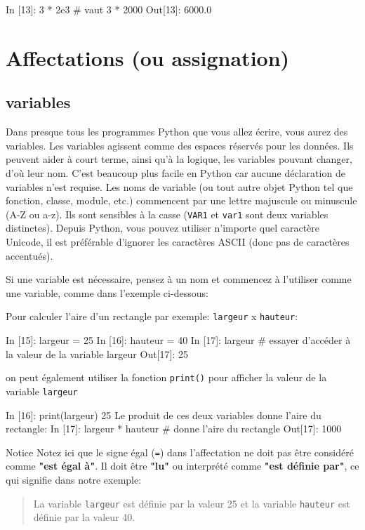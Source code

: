 \documentclass[%
oneside,                 %
final,                   %
10pt]{article}
\begin{document}
\bipy
In [13]: 3 * 2e3   # vaut 3 * 2000
Out[13]: 6000.0
\eipy
\section{Affectations (ou assignation)}

\subsection{variables}
Dans presque tous les programmes Python que vous allez écrire, vous aurez des variables. Les variables agissent comme des espaces réservés pour les données. Ils peuvent aider à court terme, ainsi qu’à la logique, les variables pouvant changer, d’où leur nom. C’est beaucoup plus facile en Python car aucune déclaration de variables n’est requise. Les noms de variable (ou tout autre objet Python tel que fonction, classe, module, etc.) commencent par une lettre majuscule ou minuscule (A-Z ou a-z). Ils sont sensibles à la casse (\texttt{VAR1} et \texttt{var1} sont deux variables distinctes). Depuis Python, vous pouvez utiliser n’importe quel caractère Unicode, il est préférable d’ignorer les caractères ASCII (donc pas de caractères accentués).

Si une variable est nécessaire, pensez à un nom et commencez à l'utiliser comme une variable, comme dans l'exemple ci-dessous:

Pour calculer l'aire d'un rectangle par exemple: \texttt{largeur} x \texttt{hauteur}:

\bipy
In [15]: largeur = 25
In [16]: hauteur = 40
In [17]: largeur    # essayer d'accéder à la valeur de la variable largeur
Out[17]: 25
\eipy

on peut également utiliser la fonction \texttt{print()} pour afficher la valeur de la variable \texttt{largeur}

\bipy
In [16]: print(largeur)
25
\eipy
Le produit de ces deux variables donne l'aire du rectangle:
\bipy
In [17]: largeur * hauteur  # donne l'aire du rectangle
Out[17]: 1000
\eipy
\begin{block}{Notice}
Notez ici que le signe égal (\texttt{=}) dans l'affectation ne doit pas être considéré comme \textbf{"est égal à"}. Il doit être \textbf{"lu"} ou interprété comme \textbf{"est définie par"}, ce qui signifie dans notre exemple:

\begin{quote}
La variable \texttt{largeur} est définie par la valeur 25 et la variable \texttt{hauteur} est définie par la valeur 40.
\end{quote}

\end{block}
\end{document}
